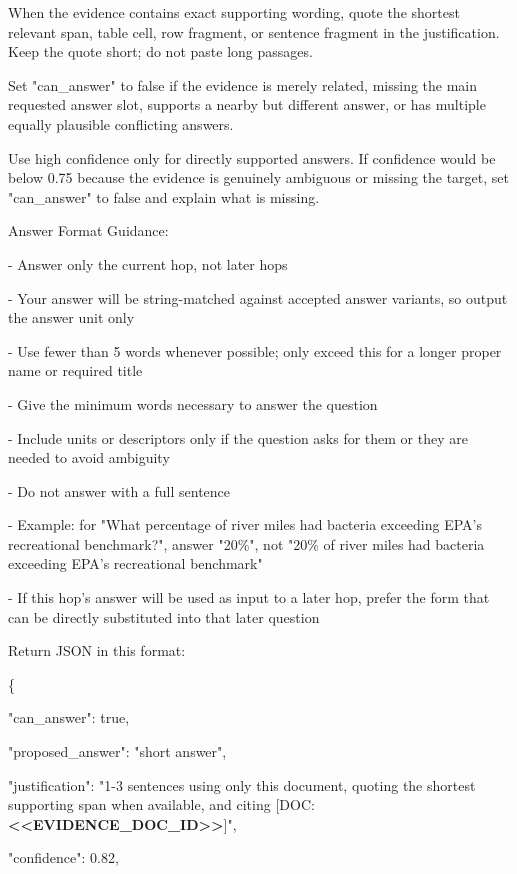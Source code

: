 \begin{tcolorbox}[colback=white, colframe=my-green, coltitle=black, parskip=5mm, title=\textbf{Document Read}, halign=flush left, enhanced, breakable, skin first=enhanced, skin middle=enhanced, skin last=enhanced]
\begin{scriptsize}
When the evidence contains exact supporting wording, quote the shortest relevant span, table cell, row fragment, or sentence fragment in the justification. Keep the quote short; do not paste long passages.\par
Set "can\_answer" to false if the evidence is merely related, missing the main requested answer slot, supports a nearby but different answer, or has multiple equally plausible conflicting answers.\par
Use high confidence only for directly supported answers. If confidence would be below 0.75 because the evidence is genuinely ambiguous or missing the target, set "can\_answer" to false and explain what is missing.\par
\mbox{}\par
Answer Format Guidance:\par
- Answer only the current hop, not later hops\par
- Your answer will be string-matched against accepted answer variants, so output the answer unit only\par
- Use fewer than 5 words whenever possible; only exceed this for a longer proper name or required title\par
- Give the minimum words necessary to answer the question\par
- Include units or descriptors only if the question asks for them or they are needed to avoid ambiguity\par
- Do not answer with a full sentence\par
- Example: for "What percentage of river miles had bacteria exceeding EPA's recreational benchmark?", answer "20\%", not "20\% of river miles had bacteria exceeding EPA's recreational benchmark"\par
- If this hop's answer will be used as input to a later hop, prefer the form that can be directly substituted into that later question\par
\mbox{}\par
Return JSON in this format:\par
\{\par
  "can\_answer": true,\par
  "proposed\_answer": "short answer",\par
  "justification": "1-3 sentences using only this document, quoting the shortest supporting span when available, and citing [DOC:\textcolor{my-green}{\textbf{\textless{}\textless{}EVIDENCE\_DOC\_ID\textgreater{}\textgreater{}}}]",\par
  "confidence": 0.82,\par

\end{scriptsize}
\end{tcolorbox}
